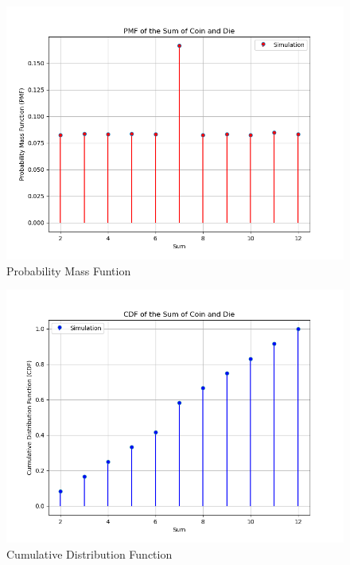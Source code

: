 \documentclass[journal]{IEEEtran}
\begin{document}
\begin{figure}[h]
\centering
\includegraphics[width=\columnwidth]{figs/pmf.png}
\caption{Probability Mass Funtion}
\label{fig:Plot1} 
\end{figure}

\begin{figure}[h]
\centering
\includegraphics[width=\columnwidth]{figs/cdf.png}
\caption{Cumulative Distribution Function}
\label{fig:Plot1} 
\end{figure}
\end{document}
